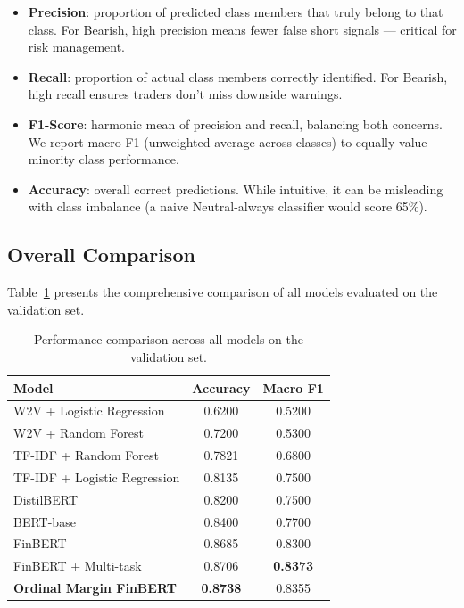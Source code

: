 \documentclass[11pt,a4paper]{article}
\begin{document}
\begin{itemize}
\item \textbf{Precision}: proportion of predicted class members that truly belong to that class. For Bearish, high precision means fewer false short signals --- critical for risk management.
\item \textbf{Recall}: proportion of actual class members correctly identified. For Bearish, high recall ensures traders don't miss downside warnings.
\item \textbf{F1-Score}: harmonic mean of precision and recall, balancing both concerns. We report macro F1 (unweighted average across classes) to equally value minority class performance.
\item \textbf{Accuracy}: overall correct predictions. While intuitive, it can be misleading with class imbalance (a naive Neutral-always classifier would score 65\%).
\end{itemize}

\subsection{Overall Comparison}

Table~\ref{tab:results} presents the comprehensive comparison of all models evaluated on the validation set.

\begin{table}[H]
\centering
\caption{Performance comparison across all models on the validation set.}
\label{tab:results}
\begin{tabular}{lcc}
\toprule
\textbf{Model} & \textbf{Accuracy} & \textbf{Macro F1} \\
\midrule
W2V + Logistic Regression & 0.6200 & 0.5200 \\
W2V + Random Forest & 0.7200 & 0.5300 \\
TF-IDF + Random Forest & 0.7821 & 0.6800 \\
TF-IDF + Logistic Regression & 0.8135 & 0.7500 \\
DistilBERT & 0.8200 & 0.7500 \\
BERT-base & 0.8400 & 0.7700 \\
FinBERT & 0.8685 & 0.8300 \\
FinBERT + Multi-task & 0.8706 & \textbf{0.8373} \\
\textbf{Ordinal Margin FinBERT} & \textbf{0.8738} & 0.8355 \\
\bottomrule
\end{tabular}
\end{table}
\end{document}
